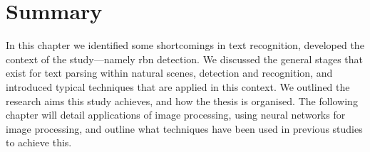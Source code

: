 




\section*{Summary}

In this chapter we identified some shortcomings in text recognition, developed the context of the study---namely \gls{rbn} detection. We discussed the general stages that exist for text parsing within natural scenes, detection and recognition, and introduced typical techniques that are applied in this context. We outlined the research aims this study achieves, and how the thesis is organised. The following chapter will detail applications of image processing, using neural networks for image processing, and outline what techniques have been used in previous studies to achieve this.